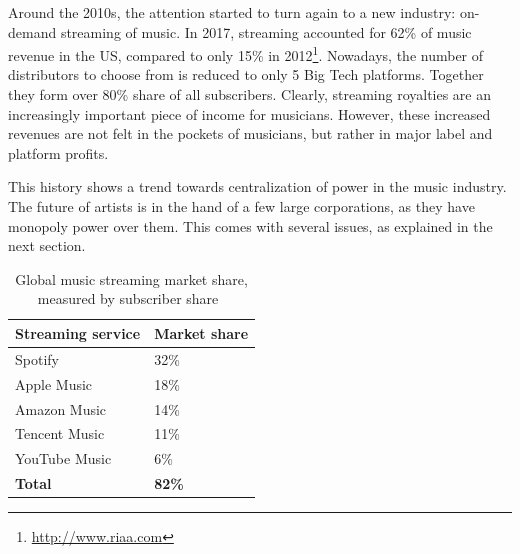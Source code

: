Around the 2010s, the attention started to turn again to a new industry: on-demand streaming of music. In 2017, streaming accounted for 62\% of music revenue in the US, compared to only 15\% in 2012\footnote{\url{http://www.riaa.com}}. Nowadays, the number of distributors to choose from is reduced to only 5 Big Tech platforms. Together they form over 80\% share of all subscribers. Clearly, streaming royalties are an increasingly important piece of income for musicians. However, these increased revenues are not felt in the pockets of musicians, but rather in major label and platform profits.

This history shows a trend towards centralization of power in the music industry. The future of artists is in the hand of a few large corporations, as they have monopoly power over them. This comes with several issues, as explained in the next section. 


\begin{table}[]
\begin{tabular}{|l|l|}
\hline
\textbf{Streaming service} & \textbf{Market share} \\ \hline
Spotify                    & 32\%                  \\ \hline
Apple Music                & 18\%                  \\ \hline
Amazon Music               & 14\%                  \\ \hline
Tencent Music              & 11\%                  \\ \hline
YouTube Music              & 6\%                   \\ \hline
\textbf{Total}             & \textbf{82\%}         \\ \hline
\end{tabular}
\caption{Global music streaming market share, measured by subscriber share~\citep{midiamarketshare2020}}
\label{tab:streaming-service-market-share}
\end{table}

